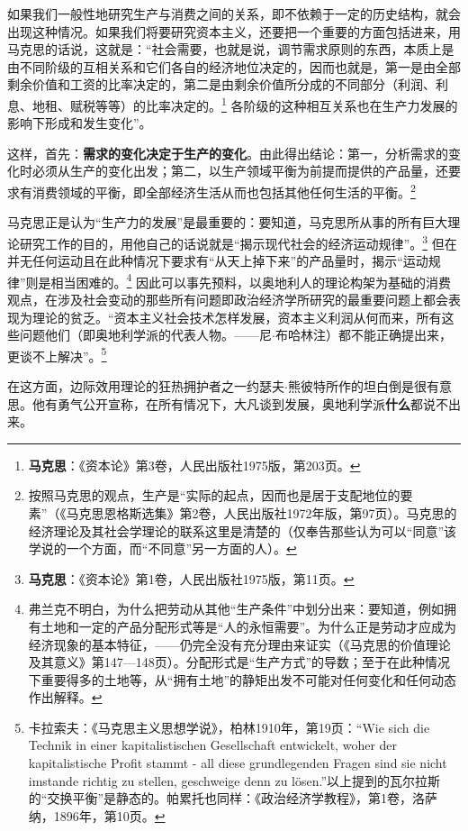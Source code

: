 \documentclass[fontset=fandol, a4paper, 12pt, openright]{ctexbook}
\begin{document}
如果我们一般性地研究生产与消费之间的关系，即不依赖于一定的历史结构，就会出现这种情况。如果我们将要研究资本主义，还要把一个重要的方面包括进来，用马克思的话说，这就是：“社会需要，也就是说，调节需求原则的东西，本质上是由不同阶级的互相关系和它们各自的经济地位决定的，因而也就是，第一是由全部剩余价值和工资的比率决定的，第二是由剩余价值所分成的不同部分（利润、利息、地租、赋税等等）的比率决定的。\footnote{\textbf{马克思}：《资本论》第3卷，人民出版社1975版，第203页。} 各阶级的这种相互关系也在生产力发展的影响下形成和发生变化”。

这样，首先：\textbf{需求的变化决定于生产的变化}。由此得出结论：第一，分析需求的变化时必须从生产的变化出发；第二，以生产领域平衡为前提而提供的产品量，还要求有消费领域的平衡，即全部经济生活从而也包括其他任何生活的平衡。\footnote{按照马克思的观点，生产是“实际的起点，因而也是居于支配地位的要素”（《马克思恩格斯选集》第2卷，人民出版社1972年版，第97页）。马克思的经济理论及其社会学理论的联系这里是清楚的（仅奉告那些认为可以“同意”该学说的一个方面，而“不同意”另一方面的人）。}

马克思正是认为“生产力的发展”是最重要的：要知道，马克思所从事的所有巨大理论研究工作的目的，用他自己的话说就是“揭示现代社会的经济运动规律”。\footnote{\textbf{马克思}：《资本论》第1卷，人民出版社1975版，第11页。} 但在并无任何运动且在此种情况下要求有“从天上掉下来”的产品量时，揭示“运动规律”则是相当困难的。\footnote{弗兰克不明白，为什么把劳动从其他“生产条件”中划分出来：要知道，例如拥有土地和一定的产品分配形式等是“人的永恒需要”。为什么正是劳动才应成为经济现象的基本特征，——仍完全没有充分理由来证实（《马克思的价值理论及其意义》第147—148页）。分配形式是“生产方式”的导数；至于在此种情况下重要得多的土地等，从“拥有土地”的静矩出发不可能对任何变化和任何动态作出解释。} 因此可以事先预料，以奥地利人的理论构架为基础的消费观点，在涉及社会变动的那些所有问题即政治经济学所研究的最重要问题上都会表现为理论的贫乏。“资本主义社会技术怎样发展，资本主义利润从何而来，所有这些问题他们（即奥地利学派的代表人物。——尼$\cdot$布哈林注）都不能正确提出来，更谈不上解决”。\footnote{卡拉索夫：《马克思主义思想学说》，柏林1910年，第19页：“Wie sich die Technik in einer kapitalistischen Gesellschaft entwickelt, woher der kapitalistische Profit stammt - all diese grundlegenden Fragen sind sie nicht imstande richtig zu stellen, geschweige denn zu l\"{o}sen.”以上提到的瓦尔拉斯的“交换平衡”是静态的。帕累托也同样：《政治经济学教程》，第1卷，洛萨纳，1896年，第10页。}

在这方面，边际效用理论的狂热拥护者之一约瑟夫$\cdot$熊彼特所作的坦白倒是很有意思。他有勇气公开宣称，在所有情况下，大凡谈到发展，奥地利学派\textbf{什么}都说不出来。
\end{document}
